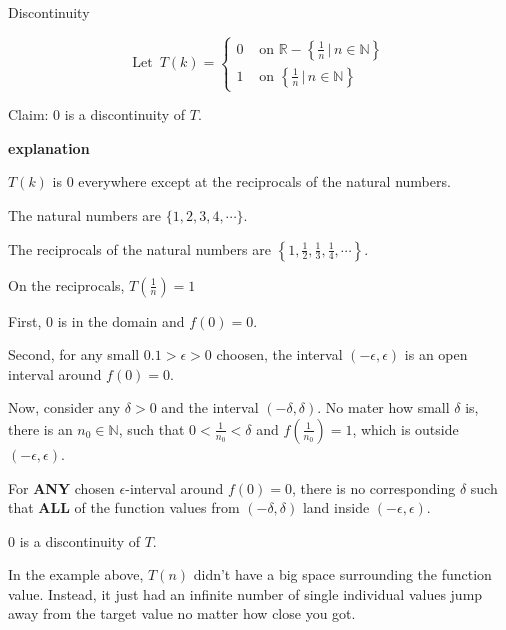 \documentclass{ximera}
\begin{document}
\begin{example}  Discontinuity


\[
\text{Let } \, T(k) = 
\begin{cases}
  0 & \text{ on } \mathbb{R} - \left\{ \frac{1}{n} \, | \, n \in \mathbb{N}     \right\} \\
  1  & \text{ on } \left\{ \frac{1}{n} \, | \, n \in \mathbb{N}     \right\}
\end{cases}
\]



Claim: $0$ is a discontinuity of $T$. 



\textbf{\textcolor{red!75!green}{explanation}} 

$T(k)$ is $0$ everywhere except at the reciprocals of the natural numbers.

The natural numbers are $\{ 1, 2, 3, 4, \cdots \}$.

The reciprocals of the natural numbers are $\left\{ 1, \frac{1}{2}, \frac{1}{3}, \frac{1}{4}, \cdots \right\}$.

On the reciprocals, $T\left(\frac{1}{n}\right) = 1$ 



First, $0$ is in the domain and $f(0) = 0$.

Second, for any small $0.1 > \epsilon > 0$ choosen, the interval $(-\epsilon, \epsilon)$ is an open interval around $f(0) = 0$. 



Now, consider any $\delta > 0$ and the interval $(-\delta, \delta)$. No mater how small $\delta$ is, there is an $n_0 \in \mathbb{N}$, such that $0 < \frac{1}{n_0} < \delta$ and $f\left(\frac{1}{n_0}\right) = 1$, which is outside $(-\epsilon, \epsilon)$. 




For \textbf{\textcolor{red!50!blue!90!black}{ANY}} chosen $\epsilon$-interval around $f(0)= 0$, there is no corresponding $\delta$ such that \textbf{\textcolor{red!50!blue!90!black}{ALL}} of the function values from  $(-\delta, \delta)$ land inside $(-\epsilon, \epsilon)$.


$0$ is a discontinuity of $T$.



\end{example}






In the example above, $T(n)$ didn't have a big space surrounding the function value.  Instead, it just had an infinite number of single individual values jump away from the target value no matter how close you got.
\end{document}
